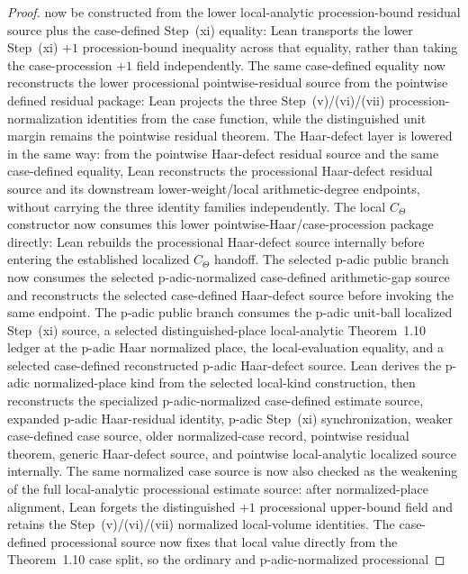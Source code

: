 \begin{proof}
  now be constructed from the lower local-analytic procession-bound residual
  source plus the case-defined Step~(xi) equality: Lean transports the lower
  Step~(xi) \(+1\) procession-bound inequality across that equality, rather
  than taking the case-procession \(+1\) field independently.  The same
  case-defined equality now reconstructs the lower processional
  pointwise-residual source from the pointwise defined residual package: Lean
  projects the three Step~(v)/(vi)/(vii) procession-normalization identities
  from the case function, while the distinguished unit margin remains the
  pointwise residual theorem.  The Haar-defect layer is lowered in the same
  way: from the pointwise Haar-defect residual source and the same
  case-defined equality, Lean reconstructs the processional Haar-defect
  residual source and its downstream lower-weight/local arithmetic-degree
  endpoints, without carrying the three identity families independently.  The
  local \(C_\Theta\) constructor now consumes this lower
  pointwise-Haar/case-procession package directly: Lean rebuilds the
  processional Haar-defect source internally before entering the established
  localized \(C_\Theta\) handoff.  The selected p-adic public branch now
  consumes the selected p-adic-normalized case-defined arithmetic-gap source
  and reconstructs the selected case-defined Haar-defect source before invoking
  the same endpoint.
  The p-adic public branch consumes the p-adic
  unit-ball localized Step~(xi) source, a selected
  distinguished-place local-analytic
  Theorem~1.10 ledger at the p-adic Haar normalized place, the
  local-evaluation equality, and a selected case-defined reconstructed p-adic
  Haar-defect source.  Lean derives the p-adic normalized-place kind from the
  selected local-kind construction, then reconstructs the specialized
  p-adic-normalized case-defined estimate source, expanded p-adic
  Haar-residual identity, p-adic Step~(xi) synchronization, weaker
  case-defined case source, older normalized-case record, pointwise residual
  theorem, generic Haar-defect source, and pointwise local-analytic localized
  source internally.  The same normalized case
  source is now also checked as the weakening of the full local-analytic
  processional estimate source: after normalized-place alignment, Lean forgets
  the distinguished \(+1\) processional upper-bound field and retains the
  Step~(v)/(vi)/(vii) normalized local-volume identities.  The
  case-defined processional source now fixes that local value directly from the
  Theorem~1.10 case split, so the ordinary and p-adic-normalized processional

\end{proof}
